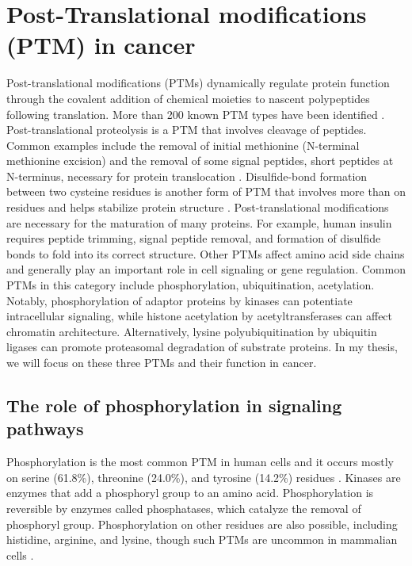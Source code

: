 \section{Post-Translational modifications (PTM) in cancer}
Post-translational modifications (PTMs) dynamically regulate protein function through the covalent addition of chemical moieties to nascent polypeptides following translation. More than 200 known PTM types have been identified \cite{deribeyl_dikici:PosttranslationalModifications2010}. Post-translational proteolysis is a PTM that involves cleavage of peptides. Common examples include the removal of initial methionine (N-terminal methionine excision) \cite{giglionec_meinnelt:ProteinNterminal2004} and the removal of some signal peptides, short peptides at N-terminus, necessary for protein translocation \cite{martogliob_dobbersteinb:SignalSequences1998}. Disulfide-bond formation between two cysteine residues is another form of PTM that involves more than on residues and helps stabilize protein structure \cite{wedemeyerwj_scheragaha:DisulfideBonds2000}. Post-translational modifications are necessary for the maturation of many proteins. For example, human insulin requires peptide trimming, signal peptide removal, and formation of disulfide bonds to fold into its correct structure. Other PTMs affect amino acid side chains and generally play an important role in cell signaling or gene regulation. Common PTMs in this category include phosphorylation, ubiquitination, acetylation. Notably, phosphorylation of adaptor proteins by kinases can potentiate intracellular signaling, while histone acetylation by acetyltransferases can affect chromatin architecture. Alternatively, lysine polyubiquitination by ubiquitin ligases can promote proteasomal degradation of substrate proteins. In my thesis, we will focus on these three PTMs and their function in cancer.


\subsection{The role of phosphorylation in signaling pathways}
Phosphorylation is the most common PTM in human cells and it occurs mostly on serine (61.8\%), threonine (24.0\%), and tyrosine (14.2\%) residues \cite{hornbeckpv_sullivanm:PhosphoSitePlusComprehensive2012}. Kinases are enzymes that add a phosphoryl group to an amino acid. Phosphorylation is reversible by enzymes called phosphatases, which catalyze the removal of phosphoryl group. Phosphorylation on other residues are also possible, including histidine, arginine, and lysine, though such PTMs are uncommon in mammalian cells \cite{whitefm_wolf-yadlina:MethodsAnalysis2016}.

